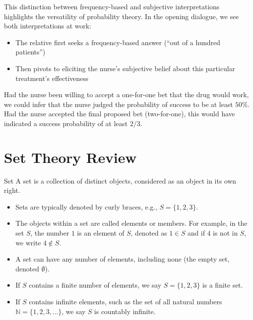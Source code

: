 
This distinction between frequency-based and subjective interpretations highlights the versatility of probability theory. In the opening dialogue, we see both interpretations at work:
\begin{itemize}
    \item The relative first seeks a frequency-based answer (``out of a hundred patients'')
    \item Then pivots to eliciting the nurse's subjective belief about this particular treatment's effectiveness
\end{itemize}

Had the nurse been willing to accept a one-for-one bet that the drug would work, we could infer that the nurse judged the probability of success to be at least \(50\%\). Had the nurse accepted the final proposed bet (two-for-one), this would have indicated a success probability of at least \(2/3\).

\section{Set Theory Review}

\begin{definitionboxbreak}{Set}
A set is a collection of distinct objects, considered as an object in its own right.
\begin{itemize}
    \item Sets are typically denoted by curly braces, e.g., \( S = \{1, 2, 3\} \).
    \item The objects within a set are called elements or members. For example, in the set \( S \), the number \( 1 \) is an element of \( S \), denoted as \( 1 \in S \) and if \( 4 \) is not in \( S \), we write \( 4 \notin S \).
    \item A set can have any number of elements, including none (the empty set, denoted \( \emptyset \)).
    \item If \(S\) contains a finite number of elements, we say \(S = \{1,2,3\}\) is a finite set.
    \item If \(S\) contains infinite elements, such as the set of all natural numbers \( \mathbb{N} = \{1, 2, 3, \ldots\} \), we say \(S\) is countably infinite.
\end{itemize}

\end{definitionboxbreak}

